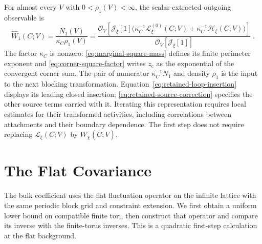 \documentclass[11pt]{article}
\begin{document}
For almost every $V$ with $0<\rho_1(V)<\infty$, the scalar-extracted outgoing observable is
\begin{equation}\label{eq:retained-outgoing-observable}
    \widehat W_1(C;V)=\frac{N_1(V)}{\kappa_C\rho_1(V)}
        =\frac{\mathcal O_V\left[\mathcal J_\xi[1]
            \bigl(\kappa_C^{-1}\mathcal L_\xi^{(0)}(C;V)
                +\kappa_C^{-1}\mathcal H_\xi(C;V)\bigr)\right]}
            {\mathcal O_V[\mathcal J_\xi[1]]}\;.
\end{equation}
The factor $\kappa_C$ is nonzero: \eqref{eq:marginal-square-mass} defines its finite perimeter exponent and \eqref{eq:corner-square-factor} writes $z_{\mathrm c}$ as the exponential of the convergent corner sum. The pair of numerator $\kappa_C^{-1}N_1$ and density $\rho_1$ is the input to the next blocking transformation. Equation~\eqref{eq:retained-loop-insertion} displays its leading closed insertion; \eqref{eq:retained-source-correction} specifies the other source terms carried with it. Iterating this representation requires local estimates for their transformed activities, including correlations between attachments and their boundary dependence. The first step does not require replacing $\mathcal L_\xi(C;V)$ by $W_\chi(\bar C;V)$.

\appendix
\section{The Flat Covariance}\label{app:flat-covariance}

The bulk coefficient uses the flat fluctuation operator on the infinite lattice with the same periodic block grid and constraint extension. We first obtain a uniform lower bound on compatible finite tori, then construct that operator and compare its inverse with the finite-torus inverses. This is a quadratic first-step calculation at the flat background.
\end{document}
